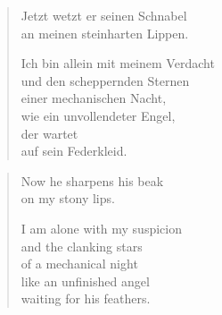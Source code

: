 \clearpage

\begin{verse}

Jetzt wetzt er seinen Schnabel\\
an meinen steinharten Lippen.

Ich bin allein mit meinem Verdacht\\
und den scheppernden Sternen\\
einer mechanischen Nacht,\\
wie ein unvollendeter Engel,\\
der wartet\\
auf sein Federkleid.
\end{verse}

\clearpage

\begin{verse}
Now he sharpens his beak\\
on my stony lips.

I am alone with my suspicion\\
and the clanking stars\\
of a mechanical night\\
like an unfinished angel\\
waiting for his feathers.
\end{verse}

\let\PoemTitlefont=\oldpoemfont


